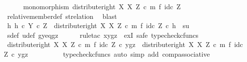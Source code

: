 \begin{isabellebody}
\ \ \ \ \isamarkupfalse%
\ {\isachardoublequoteopen}monomorphism\ {\isacharparenleft}{\kern0pt}distribute{\isacharunderscore}{\kern0pt}right\ X\ X\ Z\ {\isasymcirc}\isactrlsub c\ m\ {\isasymtimes}\isactrlsub f\ id\isactrlsub c\ Z{\isacharparenright}{\kern0pt}{\isachardoublequoteclose}\isanewline
\ \ \ \ \ \ \isamarkupfalse%
\ relative{\isacharunderscore}{\kern0pt}member{\isacharunderscore}{\kern0pt}def{}\ st{\isacharunderscore}{\kern0pt}relation\ \isamarkupfalse%
\ blast\isanewline
\isanewline
\ \ \ \ \isamarkupfalse%
\ {\isachardoublequoteopen}{\isasymexists}h{\isachardot}{\kern0pt}\ h\ {\isasymin}\isactrlsub c\ Y\ {\isasymtimes}\isactrlsub c\ Z\ {\isasymand}\ {\isacharparenleft}{\kern0pt}distribute{\isacharunderscore}{\kern0pt}right\ X\ X\ Z\ {\isasymcirc}\isactrlsub c\ m\ {\isasymtimes}\isactrlsub f\ id\isactrlsub c\ Z{\isacharparenright}{\kern0pt}\ {\isasymcirc}\isactrlsub c\ h\ {\isacharequal}{\kern0pt}\ {\isasymlangle}s{\isacharcomma}{\kern0pt}u{\isasymrangle}{\isachardoublequoteclose}\isanewline
\ \ \ \ \ \ \isamarkupfalse%
\ s{\isacharunderscore}{\kern0pt}def\ u{\isacharunderscore}{\kern0pt}def\ gy{\isacharunderscore}{\kern0pt}eq{\isacharunderscore}{\kern0pt}gz\isanewline
\ \ \ \ \isamarkupfalse%
\ {\isacharparenleft}{\kern0pt}rule{\isacharunderscore}{\kern0pt}tac\ x{\isacharequal}{\kern0pt}{\isachardoublequoteopen}{\isasymlangle}y{\isacharcomma}{\kern0pt}gz{\isasymrangle}{\isachardoublequoteclose}\ \ exI{\isacharcomma}{\kern0pt}\ safe{\isacharcomma}{\kern0pt}\ typecheck{\isacharunderscore}{\kern0pt}cfuncs{\isacharparenright}{\kern0pt}\isanewline
\ \ \ \ \ \ \isamarkupfalse%
\ {\isachardoublequoteopen}{\isacharparenleft}{\kern0pt}distribute{\isacharunderscore}{\kern0pt}right\ X\ X\ Z\ {\isasymcirc}\isactrlsub c\ m\ {\isasymtimes}\isactrlsub f\ id\isactrlsub c\ Z{\isacharparenright}{\kern0pt}\ {\isasymcirc}\isactrlsub c\ {\isasymlangle}y{\isacharcomma}{\kern0pt}gz{\isasymrangle}\ {\isacharequal}{\kern0pt}\ distribute{\isacharunderscore}{\kern0pt}right\ X\ X\ Z\ {\isasymcirc}\isactrlsub c\ {\isacharparenleft}{\kern0pt}m\ {\isasymtimes}\isactrlsub f\ id\isactrlsub c\ Z{\isacharparenright}{\kern0pt}\ {\isasymcirc}\isactrlsub c\ {\isasymlangle}y{\isacharcomma}{\kern0pt}gz{\isasymrangle}{\isachardoublequoteclose}\isanewline
\ \ \ \ \ \ \ \ \isamarkupfalse%
\ {\isacharparenleft}{\kern0pt}typecheck{\isacharunderscore}{\kern0pt}cfuncs{\isacharcomma}{\kern0pt}\ auto\ simp\ add{\isacharcolon}{\kern0pt}\ comp{\isacharunderscore}{\kern0pt}associative{}{\isacharparenright}{\kern0pt}\isanewline

\end{isabellebody}

